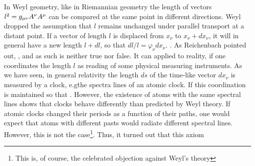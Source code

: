 \documentclass[draft]{article}
\newcommand{\phin}{\ensuremath{\varphi_\nu}\xspace}
\begin{document}
\begin{W}
\item\label{W1} In Weyl geometry, like in Riemannian geometry the length of vectors  $l^2=g_{\mu\nu} A^\nu A^\mu$ can be compared at the same point in different directions. Weyl dropped the assumption that $l$ remains unchanged under parallel transport at a distant point. If a vector of length $l$ is displaced from $x_\nu$ to $x_\nu+dx_\nu$, it will in general have a new length $l+dl$, so that $dl/l=\phin dx_\nu$. . As Reichenbach pointed out,  \citep[366]{Reichenbach1922a}, and as such is neither true nor false. It can applied to reality, if one coordinates the length $l$ as reading of some physical measuring instruments. As we have seen, in general relativity the length $ds$ of the time-like vector $dx_\nu$ is measured by a clock, e.g\. the spectra lines of an atomic clock. If this coordination is maintained so that  \citep[366]{Reichenbach1922a}. However, the existence of atoms with the same spectral lines shows that clocks behave differently than predicted by Weyl theory. If atomic clocks changed their periods as a function of their \spti paths, one would expect that atoms with different pasts would radiate different spectral lines. However, this is not the case\footnote{This is, of course, the celebrated objection against Weyl's theory }. Thus, it turned out that this axiom   \citep[366]{Reichenbach1922a}


\end{W}
\end{document}
